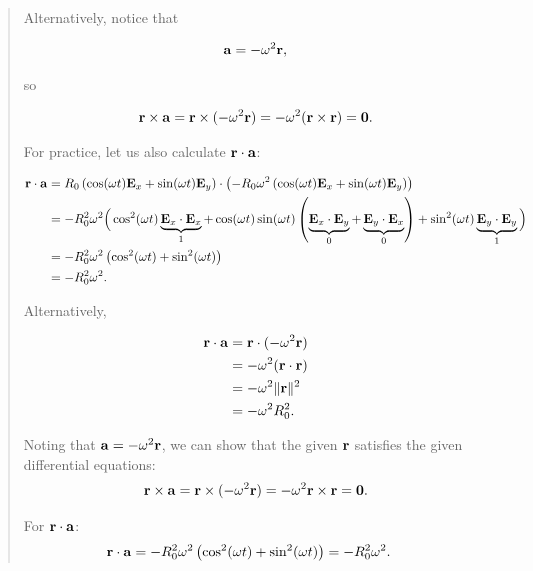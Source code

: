 \documentclass[
  letterpaper,
  DIV=11,
  numbers=noendperiod]{scrreprt}
\newcommand{\lp}{\left(}
\newcommand{\rp}{\right)}
\begin{document}
\begin{tcolorbox}
\begin{quote}
Alternatively, notice that

\begin{align*}
{\bf a} = -\omega^2{\bf r},
\end{align*}

so

\begin{align*}
{\bf r}\times{\bf a}
=
{\bf r}\times(-\omega^2{\bf r})
=
-\omega^2({\bf r}\times{\bf r})
=
{\bf 0}.
\end{align*}

For practice, let us also calculate \({\bf r}\cdot{\bf a}\):

\begin{align*}
{\bf r}\cdot{\bf a}
&=
R_0\left(\cos(\omega t){\bf E}_x+\sin(\omega t){\bf E}_y\right)
\cdot
\left(
-R_0\omega^2\left(\cos(\omega t){\bf E}_x+\sin(\omega t){\bf E}_y\right)
\right) \\
&=
-R_0^2\omega^2
\Big(
\cos^2(\omega t)\underbrace{{\bf E}_x\cdot{\bf E}_x}_{1}
+\cos(\omega t)\sin(\omega t)
\left(
\underbrace{{\bf E}_x\cdot{\bf E}_y}_{0}
+
\underbrace{{\bf E}_y\cdot{\bf E}_x}_{0}
\right)
+\sin^2(\omega t)\underbrace{{\bf E}_y\cdot{\bf E}_y}_{1}
\Big) \\
&=
-R_0^2\omega^2
\left(\cos^2(\omega t)+\sin^2(\omega t)\right) \\
&=
-R_0^2\omega^2.
\end{align*}

Alternatively,

\begin{align*}
{\bf r}\cdot{\bf a}
&=
{\bf r}\cdot(-\omega^2{\bf r}) \\
&=
-\omega^2({\bf r}\cdot{\bf r}) \\
&=
-\omega^2\|{\bf r}\|^2 \\
&=
-\omega^2R_0^2.
\end{align*}

Noting that \({\bf a} = -\omega^2{\bf r}\), we can show that the given
\({\bf r}\) satisfies the given differential equations: \begin{align*}
    {\bf r}\times{\bf a} = {\bf r}\times(-\omega^2{\bf r}) = -\omega^2{\bf r}\times{\bf r} = {\bf 0}.
\end{align*}

For \({\bf r}\cdot{\bf a}\): \begin{align*}
    {\bf r}\cdot{\bf a} &= -R_0^2\omega^2\lp\cos^2(\omega t)+\sin^2(\omega t)\rp = -R_0^2\omega^2.
\end{align*}
\end{quote}

\end{tcolorbox}
\end{document}

